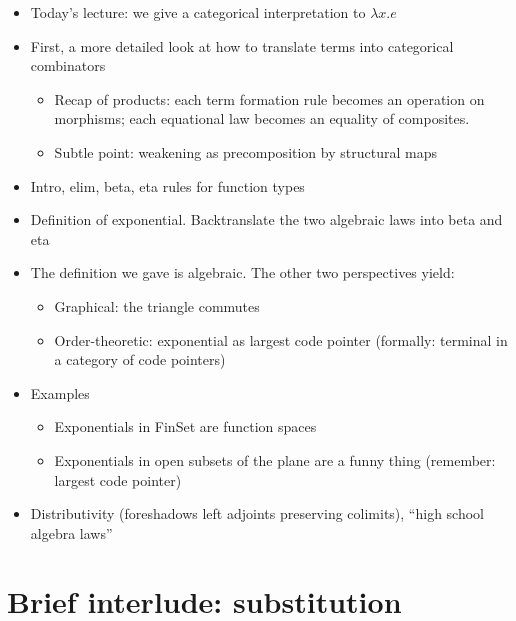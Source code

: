 \begin{itemize}
  \item Today's lecture: we give a categorical interpretation to $\lambda x . e$
  \item First, a more detailed look at how to translate terms into categorical combinators
    \begin{itemize}
      \item Recap of products: each term formation rule becomes an operation on morphisms;
        each equational law becomes an equality of composites.
      \item Subtle point: weakening as precomposition by structural maps
    \end{itemize}
  \item Intro, elim, beta, eta rules for function types
  \item Definition of exponential. Backtranslate the two algebraic laws into beta and eta
  \item The definition we gave is algebraic. The other two perspectives yield:
    \begin{itemize}
    \item Graphical: the triangle commutes
    \item Order-theoretic: exponential as largest code pointer (formally:
            terminal in a category of code pointers)
    \end{itemize}
  \item Examples
    \begin{itemize}
    \item Exponentials in FinSet are function spaces
    \item Exponentials in open subsets of the plane are a funny thing (remember:
      largest code pointer)
    \end{itemize}
  \item Distributivity (foreshadows left adjoints preserving colimits),
    ``high school algebra laws''
\end{itemize}

\section{Brief interlude: substitution}

